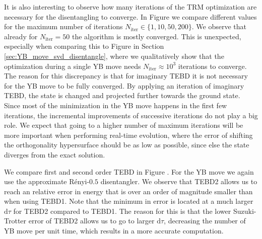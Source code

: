 %

%
It is also interesting to observe how many iterations of the TRM optimization are necessary for the disentangling to converge. In Figure  we compare different values for the maximum number of iterations $N_\text{iter} \in \{1, 10, 50, 200\}$. We observe that already for $N_\text{iter} = 50$ the algorithm is mostly converged. This is unexpected, especially when comparing this to Figure  in Section \ref{sec:YB_move_svd_disentangle}, where we qualitatively show that the optimization during a single YB move needs $N_\text{iter} \approx 10^{3}$ iterations to converge. The reason for this discrepancy is that for imaginary TEBD it is not necessary for the YB move to be fully converged. By applying an iteration of imaginary TEBD, the state is changed and projected further towards the ground state. Since most of the minimization in the YB move happens in the first few iterations, the incremental improvements of successive iterations do not play a big role. We expect that going to a higher number of maximum iterations will be more important when performing real-time evolution, where the error of shifting the orthogonality hypersurface should be as low as possible, since else the state diverges from the exact solution. \par

We compare first and second order TEBD in Figure . For the YB move we again use the approximate Rényi-$0.5$ disentangler. We observe that TEBD2 allows us to reach an relative error in energy that is over an order of magnitude smaller than when using TEBD1. Note that the minimum in error is located at a much larger $\text{d}\tau$ for TEBD2 compared to TEBD1. The reason for this is that the lower Suzuki-Trotter error of TEBD2 allows us to go to larger $\text{d}\tau$, decreasing the number of YB move per unit time, which results in a more accurate computation. \par
%

%
